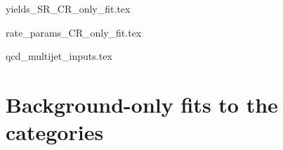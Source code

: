 \clearpage




{yields_SR_CR_only_fit.tex}
\clearpage




{rate_params_CR_only_fit.tex}
\clearpage




{qcd_multijet_inputs.tex}
\clearpage




\section{Background-only fits to the \texorpdfstring{\ttH}{ttH} categories}
\label{sec:B_only_fit_plots_ttH_SR}

